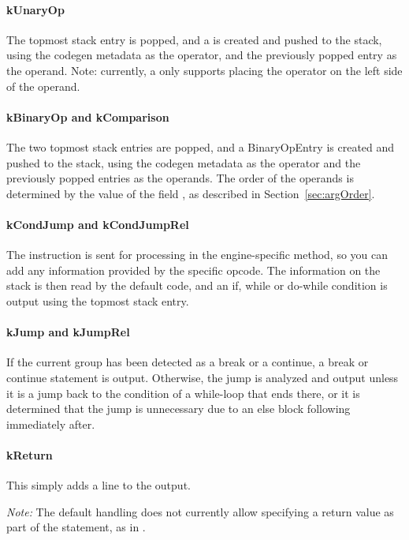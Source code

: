 \paragraph{kUnaryOp}
The topmost stack entry is popped, and a  is created and pushed to the stack, using the codegen metadata as the operator, and the previously popped entry as the operand. Note: currently, a  only supports placing the operator on the left side of the operand.

\paragraph{kBinaryOp and kComparison}
The two topmost stack entries are popped, and a BinaryOpEntry is created and pushed to the stack, using the codegen metadata as the operator and the previously popped entries as the operands. The order of the operands is determined by the value of the field , as described in Section~\vref{sec:argOrder}.

\paragraph{kCondJump and kCondJumpRel}
The instruction is sent for processing in the engine-specific  method, so you can add any information provided by the specific opcode. The information on the stack is then read by the default code, and an if, while or do-while condition is output using the topmost stack entry.

\paragraph{kJump and kJumpRel}
If the current group has been detected as a break or a continue, a break or continue statement is output. Otherwise, the jump is analyzed and output unless it is a jump back to the condition of a while-loop that ends there, or it is determined that the jump is unnecessary due to an else block following immediately after.

\paragraph{kReturn}
This simply adds a line  to the output.

\emph{Note:} The default handling does not currently allow specifying a return value as part of the statement, as in .

